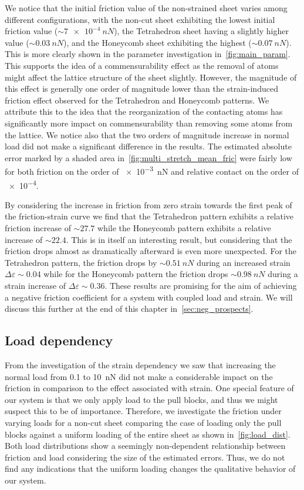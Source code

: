 We notice that the initial friction value of the non-strained sheet varies among different configurations, with the non-cut sheet exhibiting the lowest initial friction value ($\sim \SI{7e-4}{nN}$), the Tetrahedron sheet having a slightly higher value ($\sim \SI{0.03}{nN}$), and the Honeycomb sheet exhibiting the highest ($\sim \SI{0.07}{nN}$). This is more clearly shown in the parameter investigation in~\cref{fig:main_param}. This supports the idea of a commensurability effect as the removal of atoms might affect the lattice structure of the sheet slightly. However, the magnitude of this effect is generally one order of magnitude lower than the strain-induced friction effect observed for the Tetrahedron and Honeycomb patterns. We attribute this to the idea that the reorganization of the contacting atoms has significantly more impact on commensurability than removing some atoms from the lattice. We notice also that the two orders of magnitude increase in normal load did not
make a significant difference in the results. The estimated absolute error
marked by a shaded area in~\cref{fig:multi_stretch_mean_fric} were fairly low
for both friction on the order of \SI{e-3}{nN} and relative contact on the order of
\num{e-4}.


By considering the increase in friction from zero strain towards the first peak
of the friction-strain curve we find that the Tetrahedron pattern exhibits a
relative friction increase of $\sim 27.7$ while the Honeycomb pattern exhibits a
relative increase of $\sim 22.4$. This is in itself an interesting result, but
considering that the friction drops almost as dramatically afterward is even more unexpected. For the Tetrahedron pattern, the friction drops by
$\sim \SI{0.51}{nN}$ during an increased strain $\Delta \varepsilon \sim 0.04$
while for the Honeycomb pattern the friction drops $\sim\SI{0.98}{nN}$ during a strain increase of $\Delta \varepsilon \sim 0.36$. These results are promising for the aim of achieving a negative friction coefficient for a system with coupled load and strain. We will discuss this further at the end of this chapter in~\cref{sec:neg_prospects}.


\subsection{Load dependency}\label{sec:load_dependency}
From the investigation of the strain dependency we saw that increasing the normal load from 0.1 to \SI{10}{nN} did not make a considerable impact on the friction in comparison to the effect associated with strain. One special feature of our system is that we only apply load to the pull blocks, and thus we might suspect this to be of importance. Therefore, we investigate the friction under varying loads for a non-cut sheet comparing the case of loading only the pull blocks against a uniform loading of the entire sheet as shown in~\cref{fig:load_dist}. Both load distributions show a seemingly non-dependent relationship between friction and load considering the size of the estimated errors. Thus, we do not find any indications that the uniform loading changes the qualitative behavior of our system.

